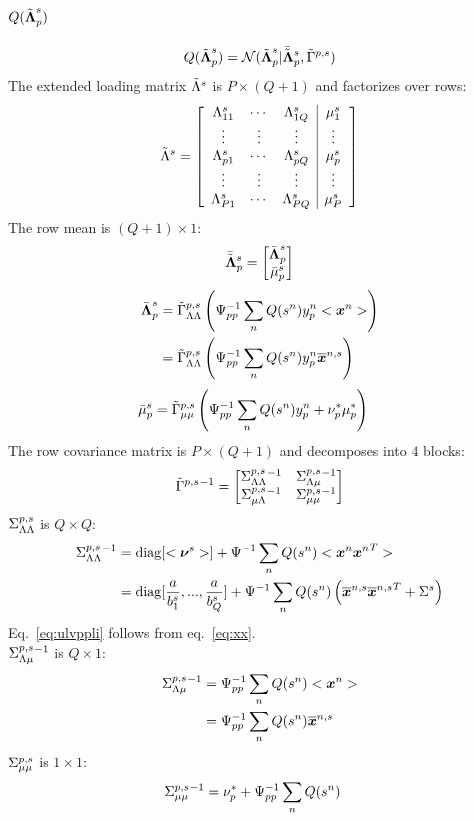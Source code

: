 \documentclass[a4paper]{article}
\begin{document}
\subsection{$Q(\tilde{\boldsymbol{\Lambda}}^s_p)$}
\begin{align}
  Q(\tilde{\boldsymbol{\Lambda}}^s_p)=\mathcal{N}(\tilde{\boldsymbol{\Lambda}}^s_p|\bar{\tilde{\boldsymbol{\Lambda}}}^s_p,\tilde{\Gamma}^{p,s})
\end{align}
The extended loading matrix $\tilde{\Lambda}^s$ is $P\times (Q+1)$ and factorizes over rows:
\begin{align}
  \tilde{\Lambda}^s=\left[
    \begin{array}{ccc|c}
      \Lambda^s_{11} & \cdots & \Lambda^s_{1Q} & \mu^s_1 \\
      \vdots & \vdots & \vdots & \vdots \\
      \Lambda^s_{p1} & \cdots & \Lambda^s_{pQ} & \mu^s_p \\
      \vdots & \vdots & \vdots & \vdots \\
      \Lambda^s_{P1} & \cdots & \Lambda^s_{PQ} & \mu^s_P
    \end{array}
  \right]
\end{align}
The row mean is $(Q+1)\times 1$:
\begin{align}
  \bar{\tilde{\boldsymbol{\Lambda}}}^s_p=\begin{bmatrix}
    \bar{\boldsymbol{\Lambda}}^s_p \\
    \bar{\mu}^s_p
  \end{bmatrix}
\end{align}
\begin{align}
  \bar{\boldsymbol{\Lambda}}^s_p
  &=\tilde{\Gamma}^{p,s}_{\Lambda\Lambda}\left(\Psi^{-1}_{pp}\sum_n Q(s^n)y^n_p<\boldsymbol{x}^n>\right) \\
  &=\tilde{\Gamma}^{p,s}_{\Lambda\Lambda}\left(\Psi^{-1}_{pp}\sum_n Q(s^n)y^n_p\overline{\boldsymbol{x}}^{n,s}\right)
\end{align}
\begin{align}
  \bar{\mu}^s_p
  &=\tilde{\Gamma}^{p,s}_{\mu\mu}\left(\Psi^{-1}_{pp}\sum_n Q(s^n)y^n_p+\nu^*_p\mu^*_p\right)
\end{align}
The row covariance matrix is $P\times(Q+1)$ and decomposes into $4$ blocks:
\begin{align}
  \tilde{\Gamma}^{p,s}{}^{-1}=\begin{bmatrix}
    \Sigma^{p,s}_{\Lambda\Lambda}{}^{-1} & \Sigma^{p,s}_{\Lambda\mu}{}^{-1} \\
    \Sigma^{p,s}_{\mu\Lambda}{}^{-1} & \Sigma^{p,s}_{\mu\mu}{}^{-1}
  \end{bmatrix}
\end{align}
$\Sigma^{p,s}_{\Lambda\Lambda}$ is $Q\times Q$:
\begin{align}
  \Sigma^{p,s}_{\Lambda\Lambda}{}^{-1}
  &=\operatorname{diag}[<\boldsymbol{\nu}^s>]+\Psi^{-1}\sum_n Q(s^n)<\boldsymbol{x}^n{\boldsymbol{x}^n}^T> \\
  &=\operatorname{diag}[\frac{a}{b^s_1},...,\frac{a}{b^s_Q}]+\Psi^{-1}\sum_n Q(s^n)\left(\overline{\boldsymbol{x}}^{n,s}{\overline{\boldsymbol{x}}^{n,s}}^T+\Sigma^s\right) \label{eq:ulvppli}
\end{align}
Eq.~\ref{eq:ulvppli} follows from eq.~\ref{eq:xx}. \\
$\Sigma^{p,s}_{\Lambda\mu}{}^{-1}$ is $Q\times 1$:
\begin{align}
  \Sigma^{p,s}_{\Lambda\mu}{}^{-1}
  &=\Psi^{-1}_{pp}\sum_n Q(s^n)<\boldsymbol{x}^n> \\
  &=\Psi^{-1}_{pp}\sum_n Q(s^n)\overline{\boldsymbol{x}}^{n,s}
\end{align}
$\Sigma^{p,s}_{\mu\mu}$ is $1\times 1$:
\begin{align}
  \Sigma^{p,s}_{\mu\mu}{}^{-1}&=
  \nu^*_p+\Psi^{-1}_{pp}\sum_n Q(s^n)
\end{align}
\end{document}
